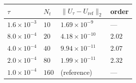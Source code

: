 \begin{tabular}{llll}
\toprule
\(\tau\) & \(N_t\) & \(\|U_\tau-U_{\mathrm{ref}}\|_2\) & order \\
\midrule
\(1.6\times10^{-3}\) & \(10\) & \(1.69\times10^{-9}\) & --- \\
\(8.0\times10^{-4}\) & \(20\) & \(4.18\times10^{-10}\) & \(2.02\) \\
\(4.0\times10^{-4}\) & \(40\) & \(9.94\times10^{-11}\) & \(2.07\) \\
\(2.0\times10^{-4}\) & \(80\) & \(1.99\times10^{-11}\) & \(2.32\) \\
\(1.0\times10^{-4}\) & \(160\) & (reference) & --- \\
\bottomrule
\end{tabular}
